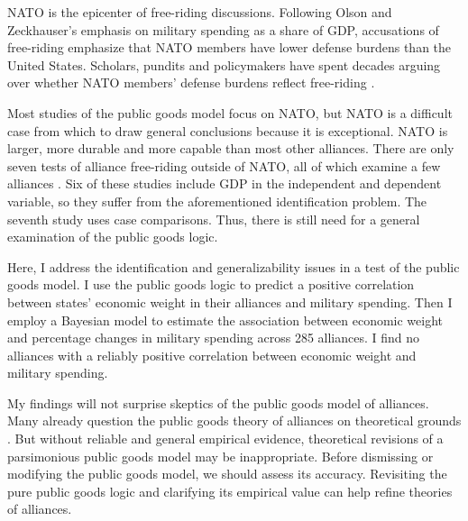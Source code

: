 \documentclass[12pt]{article}
\begin{document}
NATO is the epicenter of free-riding discussions. 
Following Olson and Zeckhauser's emphasis on military spending as a share of GDP, accusations of free-riding emphasize that NATO members have lower defense burdens than the United States. 
Scholars, pundits and policymakers have spent decades arguing over whether NATO members' defense burdens reflect free-riding \citep{SandlerForbes1980, Palmer1990, Boyer1993, GatesTerasawa1992, SandlerHartley2001, Lanoszka2015, PluemperNeumayer2015}.


Most studies of the public goods model focus on NATO, but NATO is a difficult case from which to draw general conclusions because it is exceptional. 
NATO is larger, more durable and more capable than most other alliances. 
There are only seven tests of alliance free-riding outside of NATO, all of which examine a few alliances \citep{Russett1970, Starr1974, Reisinger1983, Thies1987, ConybeareSandler1990, OnealWhatley1996, Siroky2012}. 
Six of these studies include GDP in the independent and dependent variable, so they suffer from the aforementioned identification problem.
The seventh study uses case comparisons.
Thus, there is still need for a general examination of the public goods logic. 


Here, I address the identification and generalizability issues in a test of the public goods model.  
I use the public goods logic to predict a positive correlation between states' economic weight in their alliances and military spending. 
Then I employ a Bayesian model to estimate the association between economic weight and percentage changes in military spending across 285 alliances. 
I find no alliances with a reliably positive correlation between economic weight and military spending. 


My findings will not surprise skeptics of the public goods model of alliances. 
Many already question the public goods theory of alliances on theoretical grounds \citep{Palmer1990, GatesTerasawa1992, SandlerHartley2001, Norrlof2010, NiouZeigler2019}.
But without reliable and general empirical evidence, theoretical revisions of a parsimonious public goods model may be inappropriate.
Before dismissing or modifying the public goods model, we should assess its accuracy. 
Revisiting the pure public goods logic and clarifying its empirical value can help refine theories of alliances. 
\end{document}
